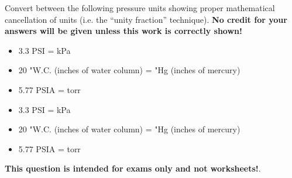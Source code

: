 

Convert between the following pressure units showing proper mathematical cancellation of units (i.e. the ``unity fraction'' technique).  {\bf No credit for your answers will be given unless this work is correctly shown!}

\begin{itemize}
\item{} 3.3 PSI = \underbar{\hskip 50pt} kPa
\item{} 20 "W.C. (inches of water column) = \underbar{\hskip 50pt} "Hg (inches of mercury)
\item{} 5.77 PSIA = \underbar{\hskip 50pt} torr
\end{itemize}







\begin{itemize}
\item{} 3.3 PSI =  kPa
\item{} 20 "W.C. (inches of water column) =  "Hg (inches of mercury)
\item{} 5.77 PSIA =  torr
\end{itemize}







{\bf This question is intended for exams only and not worksheets!}.



